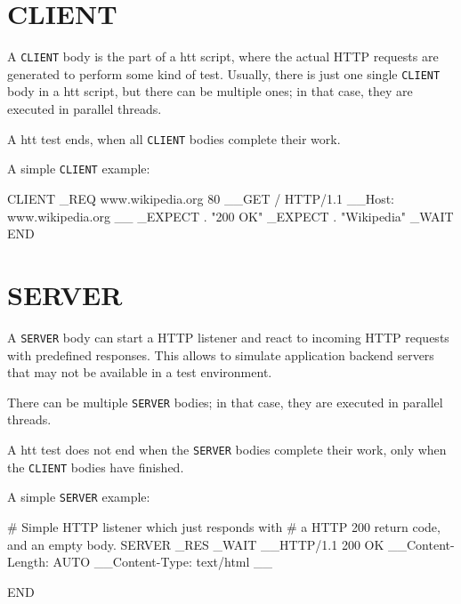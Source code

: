
\newpage
\section{CLIENT}
\label{chap:client}

A \texttt{CLIENT} body is the part of a htt script, where the actual HTTP requests 
are generated to perform some kind of test. Usually, there is just one single 
\texttt{CLIENT} body in a htt script, but there can be multiple ones; in that case, 
they are executed in parallel threads.

A htt test ends, when all \texttt{CLIENT} bodies complete their work.

A simple \texttt{CLIENT} example:

\begin{usplisting}
    CLIENT
    _REQ www.wikipedia.org 80
    __GET / HTTP/1.1
    __Host: www.wikipedia.org
    __
    _EXPECT . "200 OK"
    _EXPECT . "Wikipedia"
    _WAIT
    END
\end{usplisting}



\newpage
\section{SERVER}
\label{chap:server}

A \texttt{SERVER} body can start a HTTP listener and react to incoming HTTP 
requests with predefined responses. This allows to simulate application 
backend servers that may not be available in a test environment. 

There can be multiple \texttt{SERVER} bodies; in that case, 
they are executed in parallel threads.

A htt test does not end when the \texttt{SERVER} bodies complete their work, 
only when the \texttt{CLIENT} bodies have finished.

A simple \texttt{SERVER} example:

\begin{usplisting}
    # Simple HTTP listener which just responds with
    # a HTTP 200 return code, and an empty body.
    SERVER
    _RES
    _WAIT
    __HTTP/1.1 200 OK
    __Content-Length: AUTO
    __Content-Type: text/html
    __

    END
\end{usplisting}


